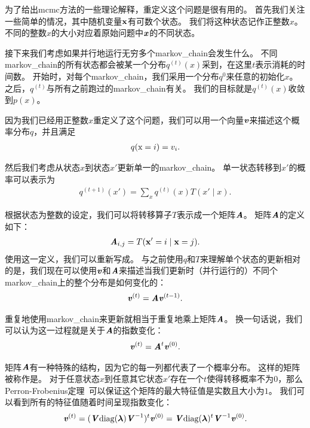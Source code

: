 为了给出\gls{mcmc}方法的一些理论解释，重定义这个问题是很有用的。
首先我们关注一些简单的情况，其中随机变量$\mathbf{x}$有可数个状态。
我们将这种状态记作正整数$x$。
不同的整数$x$的大小对应着原始问题中$\boldsymbol{\mathit{x}}$的不同状态。


接下来我们考虑如果并行地运行无穷多个\gls{markov_chain}会发生什么。
不同\gls{markov_chain}的所有状态都会被某一个分布$q^{(t)}(x)$采到，在这里$t$表示消耗的时间数。
开始时，对每个\gls{markov_chain}，我们采用一个分布$q^{{0}}$来任意的初始化$x$。
之后，$q^{(t)}$与所有之前跑过的\gls{markov_chain}有关。
我们的目标就是$q^{(t)}(x)$收敛到$p(x)$。

因为我们已经用正整数$x$重定义了这个问题，我们可以用一个向量$\boldsymbol{\mathit{v}}$来描述这个概率分布$q$，并且满足
\begin{align}
q(\mathrm{x} = i) = v_i.
\end{align}

然后我们考虑从状态$x$到状态$x'$更新单一的\gls{markov_chain}。
单一状态转移到$x'$的概率可以表示为
\begin{align}
\label{eqn:transition1}
q^{(t+1)}(x') = \sum_{x} q^{(t)}(x) T(x'\mid x).
\end{align}


根据状态为整数的设定，我们可以将转移算子$T$表示成一个矩阵$\boldsymbol{\mathit{A}}$。
矩阵$\boldsymbol{\mathit{A}}$的定义如下：
\begin{align}
\boldsymbol{\mathit{A}}_{i,j} = T(\mathbf{x}' = i\mid \mathbf{x} = j).
\end{align}
使用这一定义，我们可以重新写成。
与之前使用$q$和$T$来理解单个状态的更新相对的是，我们现在可以使用$\boldsymbol{\mathit{v}}$和$\boldsymbol{\mathit{A}}$来描述当我们更新时（并行运行的）不同个\gls{markov_chain}上的整个分布是如何变化的：
\begin{align}
\boldsymbol{\mathit{v}}^{(t)} = \boldsymbol{\mathit{A}} \boldsymbol{\mathit{v}}^{(t-1)}.
\end{align}

重复地使用\gls{markov_chain}来更新就相当于重复地乘上矩阵$\boldsymbol{\mathit{A}}$。
换一句话说，我们可以认为这一过程就是关于$\boldsymbol{\mathit{A}}$的指数变化：
\begin{align}
\boldsymbol{\mathit{v}}^{(t)} = \boldsymbol{\mathit{A}}^{t} \boldsymbol{\mathit{v}}^{(0)}.
\end{align}

矩阵$\boldsymbol{\mathit{A}}$有一种特殊的结构，因为它的每一列都代表了一个概率分布。
这样的矩阵被称作是。
对于任意状态$x$到任意其它状态$x'$存在一个$t$使得转移概率不为$0$，那么Perron-Frobenius定理~\citep{perron1907theorie,frobenius1908matrizen}可以保证这个矩阵的最大特征值是实数且大小为$1$。
我们可以看到所有的特征值随着时间呈现指数变化：
\begin{align}
\boldsymbol{\mathit{v}}^{(t)} = (\boldsymbol{\mathit{V}} \text{diag}(\boldsymbol{\lambda})\boldsymbol{\mathit{V}}^{-1})^{t} \boldsymbol{\mathit{v}}^{(0)} = \boldsymbol{\mathit{V}} \text{diag}(\boldsymbol{\lambda})^t \boldsymbol{\mathit{V}}^{-1} \boldsymbol{\mathit{v}}^{(0)}.
\end{align}


